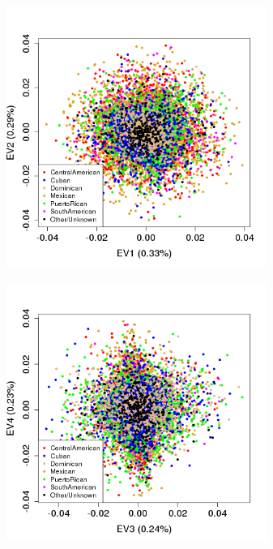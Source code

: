 \documentclass{beamer}
\begin{document}
\begin{frame}
\centering
\begin{figure}
\includegraphics[height=8.5cm]{../eigen_unrel_adjxPrunedKC_adjxPC12_ev12_col.png}
\end{figure}
\end{frame}
\clearpage
\begin{frame}
\begin{figure}
\includegraphics[height=8.5cm]{../eigen_unrel_adjxPrunedKC_adjxPC12_ev34_col.png}
\end{figure}
\end{frame}
\end{document}
